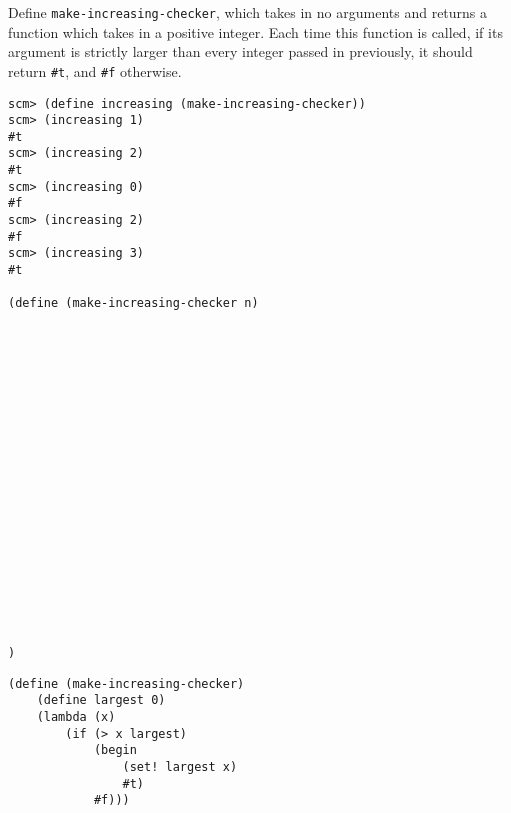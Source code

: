 \begin{blocksection}
\question
Define \texttt{make-increasing-checker}, which takes in no arguments and returns a function which takes in a positive integer. 
Each time this function is called, if its argument is strictly larger than every integer passed in previously, it should return \texttt{\#t}, 
and \texttt{\#f} otherwise. 
\begin{lstlisting}
scm> (define increasing (make-increasing-checker))
scm> (increasing 1)
#t
scm> (increasing 2)
#t
scm> (increasing 0)
#f
scm> (increasing 2)
#f
scm> (increasing 3)
#t

(define (make-increasing-checker n)




















)
\end{lstlisting}

\begin{solution}
\begin{lstlisting}
(define (make-increasing-checker)
    (define largest 0)
    (lambda (x)
        (if (> x largest)
            (begin 
                (set! largest x) 
                #t)
            #f)))
\end{lstlisting}
\end{solution}
\end{blocksection}
